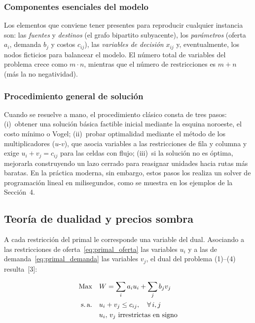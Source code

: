 \documentclass[10pt,letterpaper,twocolumn]{article}
\begin{document}
\subsubsection{Componentes esenciales del modelo}
Los elementos que conviene tener presentes para reproducir cualquier instancia son: las \emph{fuentes} y \emph{destinos} (el grafo bipartito subyacente), los \emph{parámetros} (oferta $a_i$, demanda $b_j$ y costos $c_{ij}$), las \emph{variables de decisión} $x_{ij}$ y, eventualmente, los nodos ficticios para balancear el modelo. El número total de variables del problema crece como $m\cdot n$, mientras que el número de restricciones es $m+n$ (más la no negatividad).

\subsubsection{Procedimiento general de solución}
Cuando se resuelve a mano, el procedimiento clásico consta de tres pasos: (i)~obtener una solución básica factible inicial mediante la esquina noroeste, el costo mínimo o Vogel; (ii)~probar optimalidad mediante el método de los multiplicadores ($u$-$v$), que asocia variables a las restricciones de fila y columna y exige $u_i + v_j = c_{ij}$ para las celdas con flujo; (iii)~si la solución no es óptima, mejorarla construyendo un lazo cerrado para reasignar unidades hacia rutas más baratas. En la práctica moderna, sin embargo, estos pasos los realiza un solver de programación lineal en milisegundos, como se muestra en los ejemplos de la Sección~4.

\subsection{Teoría de dualidad y precios sombra}

A cada restricción del primal le corresponde una variable del dual. Asociando a las restricciones de oferta~\eqref{eq:primal_oferta} las variables $u_i$ y a las de demanda~\eqref{eq:primal_demanda} las variables $v_j$, el dual del problema (1)--(4) resulta~[3]:

\begin{align}
\text{Max}\quad & W = \sum_{i} a_i u_i + \sum_{j} b_j v_j \label{eq:dual_obj}\\
\text{s.\,a.}\quad & u_i + v_j \leq c_{ij}, \quad \forall\, i, j \label{eq:dual_rest}\\
                   & u_i,\, v_j \text{ irrestrictas en signo} \label{eq:dual_no_sign}
\end{align}
\end{document}
